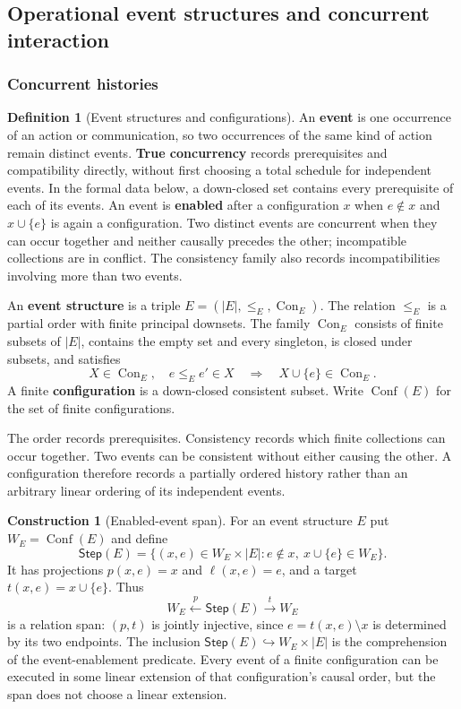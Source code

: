 \documentclass[11pt,a4paper]{article}
\numberwithin{equation}{section}
\theoremstyle{definition}
\newtheorem{definition}[theorem]{Definition}
\newtheorem{construction}[construction]{Construction}
\theoremstyle{remark}
\theoremstyle{plain}
\begin{document}
\subsection{Operational event structures and concurrent interaction}
\label{sec:egt-interaction}

\subsubsection{Concurrent histories}

\begin{definition}[Event structures and configurations]
\label{def:egt-event-structures-and-configurations}
An \textbf{event} is one occurrence of an action or communication, so two
occurrences of the same kind of action remain distinct events.
\textbf{True concurrency} records prerequisites and compatibility directly,
without first choosing a total schedule for independent events. In the
formal data below, a down-closed set contains every prerequisite of each
of its events. An event is \textbf{enabled} after a configuration $x$ when
$e\notin x$ and $x\cup\{e\}$ is again a configuration. Two distinct events are concurrent
when they can occur together and neither causally precedes the other;
incompatible collections are in conflict. The consistency family also
records incompatibilities involving more than two events.

An \textbf{event structure} is a triple $E=(|E|,\leq_E,\operatorname{Con}_E)$.
The relation $\leq_E$ is a partial order with finite principal downsets.
The family $\operatorname{Con}_E$ consists of finite subsets of $|E|$, contains the
empty set and every singleton, is closed under subsets, and satisfies
\[
 X\in\operatorname{Con}_E,\quad e\leq_E e'\in X
 \quad\Longrightarrow\quad X\cup\{e\}\in\operatorname{Con}_E.
\]
A finite \textbf{configuration} is a down-closed consistent subset.
Write $\operatorname{Conf}(E)$ for the set of finite configurations.
\end{definition}

The order records prerequisites. Consistency records which finite collections
can occur together. Two events can be consistent without either causing the
other. A configuration therefore records a partially ordered history rather
than an arbitrary linear ordering of its independent events.

\begin{construction}[Enabled-event span]
\label{con:egt-enabled-event-span}
For an event structure $E$ put $W_E=\operatorname{Conf}(E)$ and define
\[
 \mathsf{Step}(E)
 =\{(x,e)\in W_E\times|E|:e\notin x,\ x\cup\{e\}\in W_E\}.
\]
It has projections $p(x,e)=x$ and $\ell(x,e)=e$, and a target
$t(x,e)=x\cup\{e\}$. Thus
\[
 W_E\xleftarrow{p}\mathsf{Step}(E)\xrightarrow{t}W_E
\]
is a relation span: $(p,t)$ is jointly injective, since
$e=t(x,e)\setminus x$ is determined by its two endpoints. The inclusion
$\mathsf{Step}(E)\hookrightarrow W_E\times|E|$ is the comprehension
of the event-enablement predicate. Every event of a finite configuration
can be executed in some linear extension of that configuration's causal
order, but the span does not choose a linear extension.
\end{construction}
\end{document}
